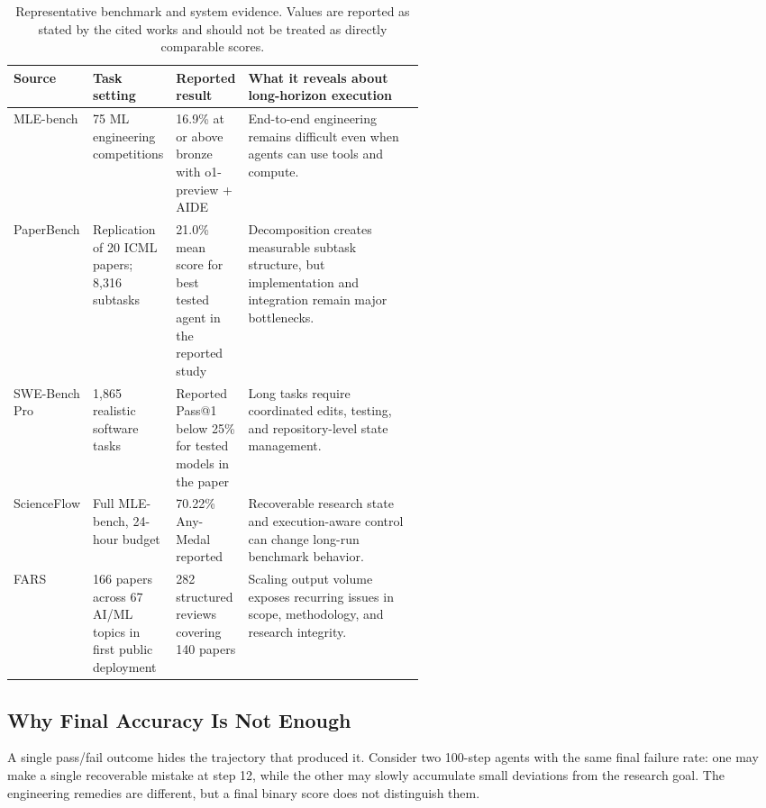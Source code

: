 \documentclass[manuscript,screen]{acmart}
\begin{document}
\begin{table}[t]
\caption{Representative benchmark and system evidence. Values are reported as stated by the cited works and should not be treated as directly comparable scores.}
\label{tab:benchmarks}
\small
\begin{tabularx}{\linewidth}{p{0.18\linewidth} p{0.18\linewidth} p{0.17\linewidth} Y}
\toprule
\textbf{Source} & \textbf{Task setting} & \textbf{Reported result} & \textbf{What it reveals about long-horizon execution}\\
\midrule
MLE-bench \cite{chan2024mlebench} & 75 ML engineering competitions & 16.9\% at or above bronze with o1-preview + AIDE & End-to-end engineering remains difficult even when agents can use tools and compute.\\
PaperBench \cite{starace2025paperbench} & Replication of 20 ICML papers; 8,316 subtasks & 21.0\% mean score for best tested agent in the reported study & Decomposition creates measurable subtask structure, but implementation and integration remain major bottlenecks.\\
SWE-Bench Pro \cite{deng2025swebenchpro} & 1,865 realistic software tasks & Reported Pass@1 below 25\% for tested models in the paper & Long tasks require coordinated edits, testing, and repository-level state management.\\
ScienceFlow \cite{zhao2026scienceflow} & Full MLE-bench, 24-hour budget & 70.22\% Any-Medal reported & Recoverable research state and execution-aware control can change long-run benchmark behavior.\\
FARS \cite{tang2026fars} & 166 papers across 67 AI/ML topics in first public deployment & 282 structured reviews covering 140 papers & Scaling output volume exposes recurring issues in scope, methodology, and research integrity.\\
\bottomrule
\end{tabularx}
\end{table}

\subsection{Why Final Accuracy Is Not Enough}
A single pass/fail outcome hides the trajectory that produced it. Consider two 100-step agents with the same final failure rate: one may make a single recoverable mistake at step 12, while the other may slowly accumulate small deviations from the research goal. The engineering remedies are different, but a final binary score does not distinguish them.
\end{document}
